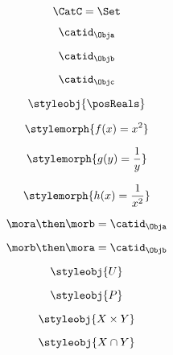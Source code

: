 {\begin{forslides}
		\begin{equation}
			\label{eq:23}
			\CatC = \Set
		\end{equation}

		\begin{equation}
			\label{eq:24}
			\catid_{\Obja}
		\end{equation}

		\begin{equation}
			\label{eq:25}
			\catid_{\Objb}
		\end{equation}

		\begin{equation}
			\label{eq:26}
			\catid_{\Objc}
		\end{equation}

		\begin{equation}
			\label{eq:27}
			\styleobj{\posReals}
		\end{equation}

		\begin{equation}
			\label{eq:28}
			\stylemorph{f(x) = x^2}
		\end{equation}

		\begin{equation}
			\label{eq:29}
			\stylemorph{g(y) = \frac{1}{y}}
		\end{equation}

		\begin{equation}
			\label{eq:30}
			\stylemorph{h(x) = \frac{1}{x^2}}
		\end{equation}

		\begin{equation}
			\label{eq:31}
			\mora \then \morb = \catid_\Obja
		\end{equation}

		\begin{equation}
			\label{eq:32}
			\morb \then \mora = \catid_\Objb
		\end{equation}

		\begin{equation}
			\label{eq:33}
			\styleobj{U}
		\end{equation}

		\begin{equation}
			\label{eq:34}
			\styleobj{P}
		\end{equation}

		\begin{equation}
			\label{eq:35}
			\styleobj{X \times Y}
		\end{equation}

		\begin{equation}
			\label{eq:36}
			\styleobj{X \cap Y}
		\end{equation}


\end{forslides}}

